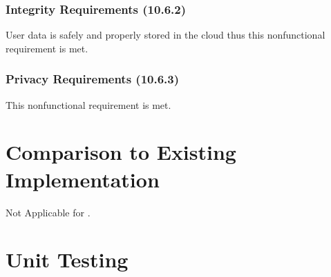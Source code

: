 \documentclass[12pt, titlepage]{article}
\begin{document}
\subsubsection{Integrity Requirements (10.6.2)}
User data is safely and properly stored in the cloud thus this nonfunctional requirement is met.

\subsubsection{Privacy Requirements (10.6.3)}
This nonfunctional requirement is met.

\section{Comparison to Existing Implementation}	
Not Applicable for \progname .

\section{Unit Testing}
\noindent
{}
\end{document}

